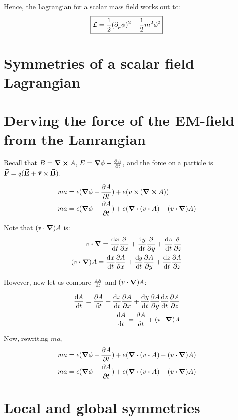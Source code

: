 Hence, the Lagrangian for a scalar mass field works out to:
\begin{equation}
    \boxed{\mathcal{L} = \frac{1}{2} (\partial_\mu \phi)^2 - \frac{1}{2} m^2 \phi^2}
\end{equation}

\section{Symmetries of a scalar field Lagrangian}
\section{Derving the force of the EM-field from the Lanrangian}

Recall that $B = \curl A$, $E = \grad \phi - \pdv{A}{t}$, and the force
on a particle is $\va F = q (\va E + \va v \times \va B)$.

\begin{align*}
ma &= e (\grad \phi - \pdv{A}{t}) + e (v \times (\curl A)) \\
ma &= e (\grad \phi - \pdv{A}{t}) + e (\div (v \vdot A) - (v \vdot \grad) A)
\end{align*}

Note that $(v \cdot \grad) A$ is:
\begin{align*}
v \vdot \grad = \dv{x}{t} \pdv{x} + \dv{y}{t} \pdv{y} + \dv{z}{t} \pdv{z} \\
(v \vdot \grad) A = \dv{x}{t} \pdv{A}{x} + \dv{y}{t} \pdv{A}{y} + \dv{z}{t} \pdv{A}{z} \\
\end{align*}

However, now let us compare $\dv{A}{t}$ and $(v \cdot \grad) A$:

\begin{align*}
\dv{A}{t} = \pdv{A}{t} + \dv{x}{t}\pdv{A}{x} + \dv{y}{t}\pdv{A}{y} \dv{z}{t}\pdv{A}{z} \\
\dv{A}{t} = \pdv{A}{t} + (v \cdot \grad) A
\end{align*}

Now, rewriting $ma$,
\begin{align*}
ma &= e (\grad \phi - \pdv{A}{t}) + e (\div (v \vdot A) - (v \vdot \grad) A) \\
ma &= e (\grad \phi - \pdv{A}{t}) + e (\div (v \vdot A) - (v \vdot \grad) A)
\end{align*}

\section{Local and global symmetries}

